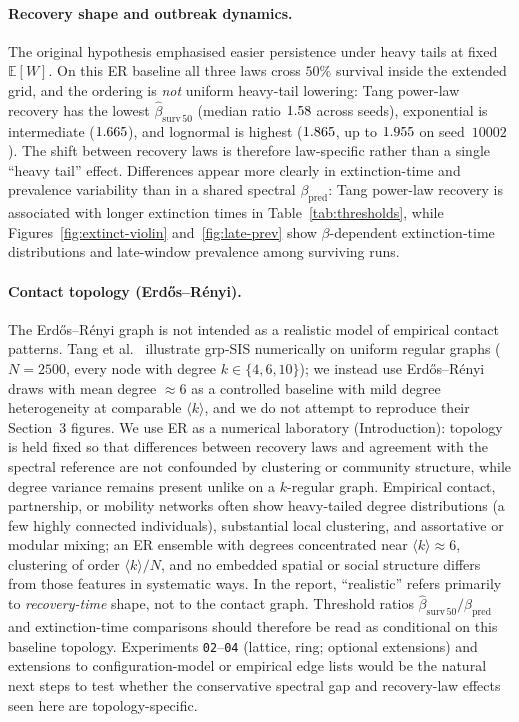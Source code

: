 \documentclass[11pt,a4paper]{article}
\begin{document}
\paragraph{Recovery shape and outbreak dynamics.}
The original hypothesis emphasised easier persistence under heavy tails at fixed $\mathbb{E}[W]$. On this ER baseline all three laws cross $50\%$ survival inside the extended grid, and the ordering is \emph{not} uniform heavy-tail lowering: Tang power-law recovery has the lowest $\hat{\beta}_{\mathrm{surv}\,50}$ (median ratio $1.58$ across seeds), exponential is intermediate ($1.665$), and lognormal is highest ($1.865$, up to $1.955$ on seed~$10002$). The shift between recovery laws is therefore law-specific rather than a single ``heavy tail'' effect. Differences appear more clearly in extinction-time and prevalence variability than in a shared spectral $\beta_{\mathrm{pred}}$: Tang power-law recovery is associated with longer extinction times in Table~\ref{tab:thresholds}, while Figures~\ref{fig:extinct-violin} and~\ref{fig:late-prev} show $\beta$-dependent extinction-time distributions and late-window prevalence among surviving runs.

\paragraph{Contact topology (Erd\H{o}s--R\'enyi).}
\label{par:er-topology}
The Erd\H{o}s--R\'enyi graph is not intended as a realistic model of empirical contact patterns. Tang et al.\ \cite{Tang2025} illustrate grp-SIS numerically on uniform regular graphs ($N{=}2500$, every node with degree $k\in\{4,6,10\}$); we instead use Erd\H{o}s--R\'enyi draws with mean degree $\approx 6$ as a controlled baseline with mild degree heterogeneity at comparable $\langle k\rangle$, and we do not attempt to reproduce their Section~3 figures. We use ER as a numerical laboratory (Introduction): topology is held fixed so that differences between recovery laws and agreement with the spectral reference are not confounded by clustering or community structure, while degree variance remains present unlike on a $k$-regular graph. Empirical contact, partnership, or mobility networks often show heavy-tailed degree distributions (a few highly connected individuals), substantial local clustering, and assortative or modular mixing; an ER ensemble with degrees concentrated near $\langle k\rangle\approx 6$, clustering of order $\langle k\rangle/N$, and no embedded spatial or social structure differs from those features in systematic ways. In the report, ``realistic'' refers primarily to \emph{recovery-time} shape, not to the contact graph. Threshold ratios $\hat{\beta}_{\mathrm{surv}\,50}/\beta_{\mathrm{pred}}$ and extinction-time comparisons should therefore be read as conditional on this baseline topology. Experiments \texttt{02}--\texttt{04} (lattice, ring; optional extensions) and extensions to configuration-model or empirical edge lists would be the natural next steps to test whether the conservative spectral gap and recovery-law effects seen here are topology-specific.
\end{document}
